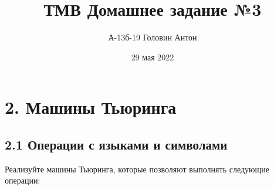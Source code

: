 \documentclass{article}
\title{ТМВ Домашнее задание №3}
\author{А-13б-19 Головин Антон}
\date{29 мая 2022}
\begin{document}
\maketitle




\section*{2. Машины Тьюринга}

\subsection*{2.1 Операции с языками и символами}

Реализуйте машины Тьюринга, которые позволяют выполнять следующие операции:
\end{document}
